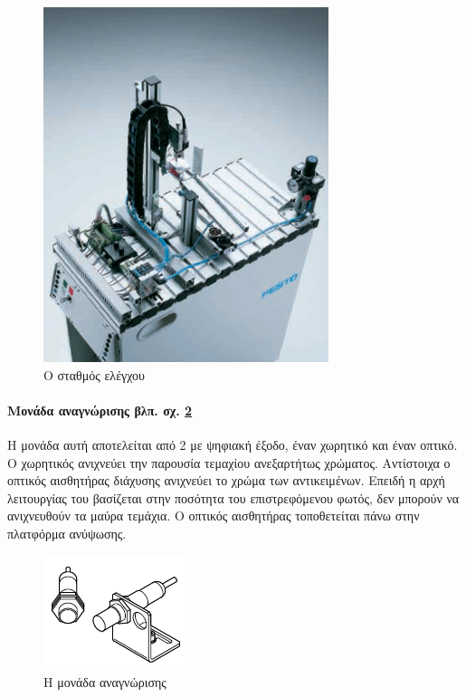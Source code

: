 \documentclass[a4paper,12pt,twoside]{report}
\begin{document}
				\begin{figure}[hp]
					\centering
					\includegraphics[scale=0.25]{TestingStationFesto.png}
					\caption{Ο σταθμός ελέγχου \cite{OverviewMPSStations}}
					\label{φωτ:Ο σταθμός ελέγχου από Festo}
				\end{figure}
								
				\paragraph{Μονάδα αναγνώρισης {\footnotesize βλπ. σχ. \ref{φωτ:Η μονάδα αναγνώρισης από Festo}}} {Η μονάδα αυτή αποτελείται από 2  με ψηφιακή έξοδο, έναν χωρητικό και έναν οπτικό. Ο χωρητικός ανιχνεύει την παρουσία τεμαχίου ανεξαρτήτως χρώματος. Αντίστοιχα ο οπτικός αισθητήρας διάχυσης ανιχνεύει το χρώμα των αντικειμένων. Επειδή η αρχή λειτουργίας του βασίζεται στην ποσότητα του επιστρεφόμενου φωτός, δεν μπορούν να ανιχνευθούν τα μαύρα τεμάχια. Ο οπτικός αισθητήρας τοποθετείται πάνω στην πλατφόρμα ανύψωσης.
				}
				\begin{figure}[hp]
					\centering
					\includegraphics[scale=1]{TestingStationRecognitionModule.png}
					\caption{Η μονάδα αναγνώρισης \cite{FestoMPSTestingStationManual}}
					\label{φωτ:Η μονάδα αναγνώρισης από Festo}
				\end{figure}
				
\end{document}
